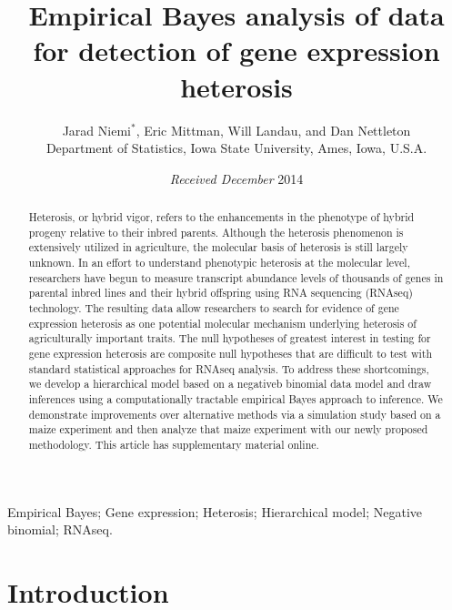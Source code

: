 \documentclass[useAMS,usenatbib,referee]{biom}
\title{Empirical Bayes analysis of \RNAseq{} data for detection of gene expression heterosis}
\author{Jarad Niemi$^*$\email{niemi@iastate.edu}, 
Eric Mittman, 
Will Landau, and 
Dan Nettleton \\
Department of Statistics, Iowa State University, Ames, Iowa, U.S.A.}
\newcommand{\RNAseq}{RNAseq}
\begin{document}
\date{{\it Received December} 2014} 

\pagerange{\pageref{firstpage}--\pageref{lastpage}} 

\label{firstpage}

\begin{abstract}
Heterosis, or hybrid vigor, refers to the enhancements in the phenotype of hybrid progeny relative to their inbred parents. Although the heterosis phenomenon is extensively utilized in agriculture, the molecular basis of heterosis is still largely unknown. In an effort to understand phenotypic heterosis at the molecular level, researchers have begun to measure transcript abundance levels of thousands of genes in parental inbred lines and their hybrid offspring using RNA sequencing (\RNAseq{}) technology.  The resulting data allow researchers to search for evidence of gene expression heterosis as one potential molecular mechanism underlying heterosis of agriculturally important traits.  The null hypotheses of greatest interest in testing for gene expression heterosis are composite null hypotheses that are difficult to test with standard statistical approaches for \RNAseq{} analysis. To address these shortcomings, we develop a hierarchical model based on a negativeb binomial data model and draw inferences using a computationally tractable empirical Bayes approach to inference. We demonstrate improvements over alternative methods via a simulation study based on a maize experiment and then analyze that maize experiment with our newly proposed methodology. This article has supplementary material online.
\end{abstract}

\begin{keywords}
Empirical Bayes; Gene expression; Heterosis; Hierarchical model; Negative binomial; \RNAseq{}.
\end{keywords}

\maketitle


\section{Introduction}
\label{s:intro}
\end{document}
